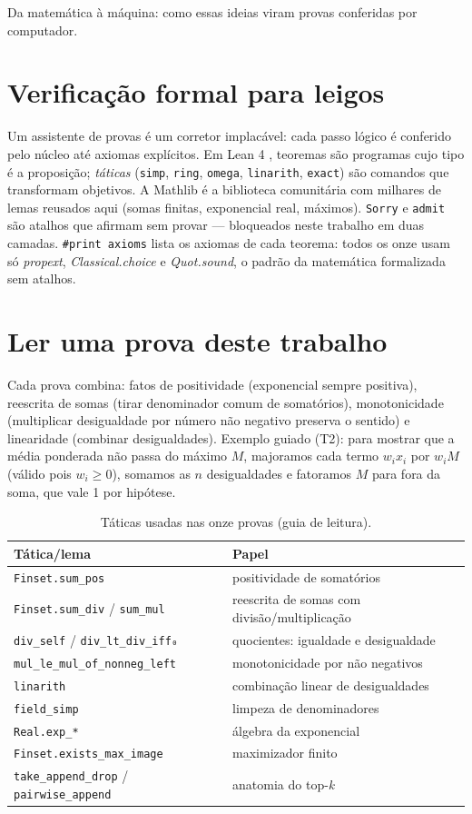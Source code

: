 Da matemática à máquina: como essas ideias viram provas conferidas por computador.
\section{Verificação formal para leigos}
Um assistente de provas é um corretor implacável: cada passo lógico é conferido pelo núcleo até axiomas explícitos. Em Lean 4 \cite{moura2021}, teoremas são programas cujo tipo é a proposição; \textit{táticas} (\texttt{simp}, \texttt{ring}, \texttt{omega}, \texttt{linarith}, \texttt{exact}) são comandos que transformam objetivos. A Mathlib \cite{mathlib2020} é a biblioteca comunitária com milhares de lemas reusados aqui (somas finitas, exponencial real, máximos). \texttt{Sorry} e \texttt{admit} são atalhos que afirmam sem provar --- bloqueados neste trabalho em duas camadas. \texttt{\#print axioms} lista os axiomas de cada teorema: todos os onze usam só \textit{propext}, \textit{Classical.choice} e \textit{Quot.sound}, o padrão da matemática formalizada sem atalhos.
\section{Ler uma prova deste trabalho}
Cada prova combina: fatos de positividade (exponencial sempre positiva), reescrita de somas (tirar denominador comum de somatórios), monotonicidade (multiplicar desigualdade por número não negativo preserva o sentido) e linearidade (combinar desigualdades). Exemplo guiado (T2): para mostrar que a média ponderada não passa do máximo $M$, majoramos cada termo $w_ix_i$ por $w_iM$ (válido pois $w_i\geq0$), somamos as $n$ desigualdades e fatoramos $M$ para fora da soma, que vale 1 por hipótese.
\begin{table}[h]
\centering
\caption{Táticas usadas nas onze provas (guia de leitura).}
\label{tab:taticas}\begin{tabular}{ll}
\toprule
Tática/lema & Papel \\
\midrule
\texttt{Finset.sum\_pos} & positividade de somatórios \\
\texttt{Finset.sum\_div} / \texttt{sum\_mul} & reescrita de somas com divisão/multiplicação \\
\texttt{div\_self} / \texttt{div\_lt\_div\_iff₀} & quocientes: igualdade e desigualdade \\
\texttt{mul\_le\_mul\_of\_nonneg\_left} & monotonicidade por não negativos \\
\texttt{linarith} & combinação linear de desigualdades \\
\texttt{field\_simp} & limpeza de denominadores \\
\texttt{Real.exp\_*} & álgebra da exponencial \\
\texttt{Finset.exists\_max\_image} & maximizador finito \\
\texttt{take\_append\_drop} / \texttt{pairwise\_append} & anatomia do top-\textit{k} \\
\bottomrule
\end{tabular}
\end{table}
